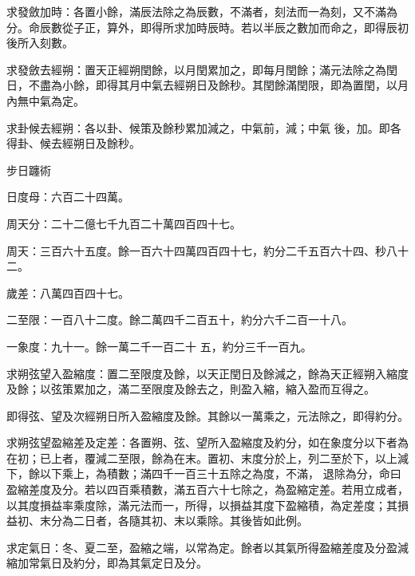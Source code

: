 \begin{pinyinscope}
 求發斂加時：各置小餘，滿辰法除之為辰數，不滿者，刻法而一為刻，又不滿為分。命辰數從子正，算外，即得所求加時辰時。若以半辰之數加而命之，即得辰初後所入刻數。



 求發斂去經朔：置天正經朔閏餘，以月閏累加之，即每月閏餘；滿元法除之為閏日，不盡為小餘，即得其月中氣去經朔日及餘秒。其閏餘滿閏限，即為置閏，以月內無中氣為定。



 求卦候去經朔：各以卦、候策及餘秒累加減之，中氣前，減；中氣
 後，加。即各得卦、候去經朔日及餘秒。



 步日躔術



 日度母：六百二十四萬。



 周天分：二十二億七千九百二十萬四百四十七。



 周天：三百六十五度。餘一百六十四萬四百四十七，約分二千五百六十四、秒八十二。



 歲差：八萬四百四十七。



 二至限：一百八十二度。餘二萬四千二百五十，約分六千二百一十八。



 一象度：九十一。餘一萬二千一百二十
 五，約分三千一百九。



 求朔弦望入盈縮度：置二至限度及餘，以天正閏日及餘減之，餘為天正經朔入縮度及餘；以弦策累加之，滿二至限度及餘去之，則盈入縮，縮入盈而互得之。



 即得弦、望及次經朔日所入盈縮度及餘。其餘以一萬乘之，元法除之，即得約分。



 求朔弦望盈縮差及定差：各置朔、弦、望所入盈縮度及約分，如在象度分以下者為在初；已上者，覆減二至限，餘為在末。置初、末度分於上，列二至於下，以上減下，餘以下乘上，為積數；滿四千一百三十五除之為度，不滿，
 退除為分，命曰盈縮差度及分。若以四百乘積數，滿五百六十七除之，為盈縮定差。若用立成者，以其度損益率乘度除，滿元法而一，所得，以損益其度下盈縮積，為定差度；其損益初、末分為二日者，各隨其初、末以乘除。其後皆如此例。



 求定氣日：冬、夏二至，盈縮之端，以常為定。餘者以其氣所得盈縮差度及分盈減縮加常氣日及約分，即為其氣定日及分。




\end{pinyinscope}
